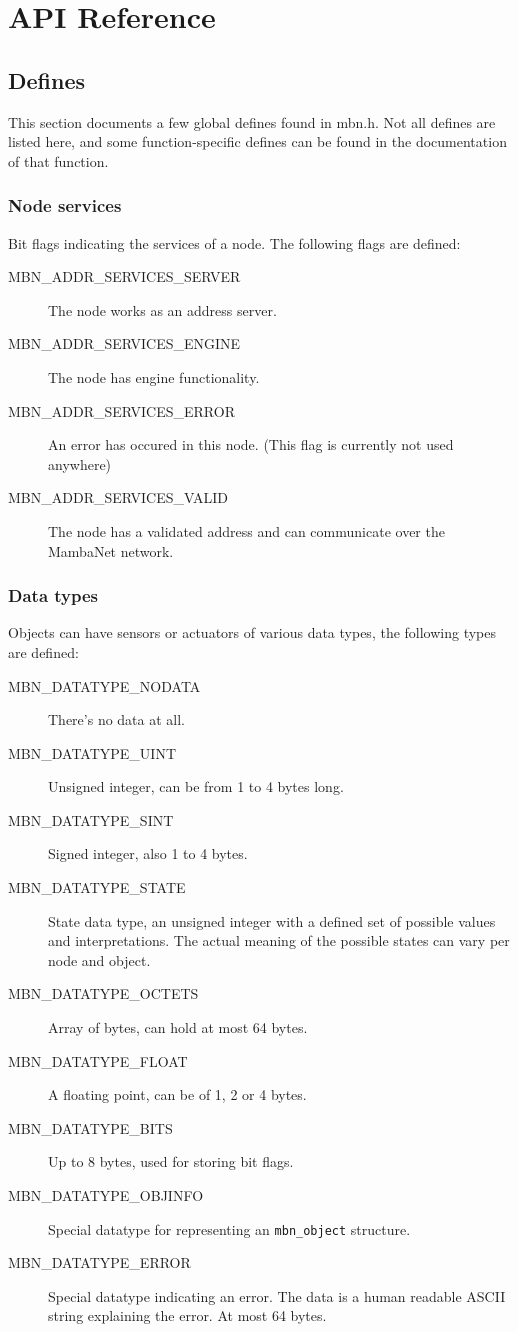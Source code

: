 \chapter{API Reference}
\section{Defines}
This section documents a few global defines found in mbn.h. Not all defines are listed here, and some function-specific defines can be found in the documentation of that function.


\subsection{Node services}
Bit flags indicating the services of a node. The following flags are defined:
\begin{description}
 \item[MBN\_ADDR\_SERVICES\_SERVER]
  The node works as an address server.
 \item[MBN\_ADDR\_SERVICES\_ENGINE]
  The node has engine functionality.
 \item[MBN\_ADDR\_SERVICES\_ERROR]
  An error has occured in this node. (This flag is currently not used anywhere)
 \item[MBN\_ADDR\_SERVICES\_VALID]
  The node has a validated address and can communicate over the MambaNet network.
\end{description}


\subsection{Data types}
Objects can have sensors or actuators of various data types, the following types are defined:
\begin{description}
 \item[MBN\_DATATYPE\_NODATA]
  There's no data at all.
 \item[MBN\_DATATYPE\_UINT]
  Unsigned integer, can be from 1 to 4 bytes long.
 \item[MBN\_DATATYPE\_SINT]
  Signed integer, also 1 to 4 bytes.
 \item[MBN\_DATATYPE\_STATE]
  State data type, an unsigned integer with a defined set of possible values and interpretations. The actual meaning of the possible states can vary per node and object.
 \item[MBN\_DATATYPE\_OCTETS]
  Array of bytes, can hold at most 64 bytes.
 \item[MBN\_DATATYPE\_FLOAT]
  A floating point, can be of 1, 2 or 4 bytes.
 \item[MBN\_DATATYPE\_BITS]
  Up to 8 bytes, used for storing bit flags.
 \item[MBN\_DATATYPE\_OBJINFO]
  Special datatype for representing an \verb|mbn_object| structure.
 \item[MBN\_DATATYPE\_ERROR]
  Special datatype indicating an error. The data is a human readable ASCII string explaining the error. At most 64 bytes.
\end{description}


